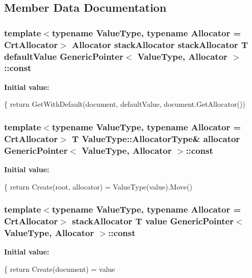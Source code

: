 \subsection{Member Data Documentation}
\subsubsection[{\texorpdfstring{const}{const}}]{\setlength{\rightskip}{0pt plus 5cm}template$<$typename Value\+Type, typename Allocator = Crt\+Allocator$>$ Allocator stack\+Allocator stack\+Allocator T default\+Value {\bf Generic\+Pointer}$<$ Value\+Type, Allocator $>$\+::const}\hypertarget{classGenericPointer_ad6e06cd83cf52e045c7e07a67078e973}{}\label{classGenericPointer_ad6e06cd83cf52e045c7e07a67078e973}
{\bfseries Initial value\+:}
\begin{DoxyCode}
\{
        \textcolor{keywordflow}{return} GetWithDefault(document, defaultValue, document.GetAllocator())
\end{DoxyCode}
\subsubsection[{\texorpdfstring{const}{const}}]{\setlength{\rightskip}{0pt plus 5cm}template$<$typename Value\+Type, typename Allocator = Crt\+Allocator$>$ T Value\+Type\+::\+Allocator\+Type\& allocator {\bf Generic\+Pointer}$<$ Value\+Type, Allocator $>$\+::const}\hypertarget{classGenericPointer_ace82428d4ad958b05a52480d949b32fa}{}\label{classGenericPointer_ace82428d4ad958b05a52480d949b32fa}
{\bfseries Initial value\+:}
\begin{DoxyCode}
\{
        \textcolor{keywordflow}{return} Create(root, allocator) = ValueType(value).Move()
\end{DoxyCode}
\subsubsection[{\texorpdfstring{const}{const}}]{\setlength{\rightskip}{0pt plus 5cm}template$<$typename Value\+Type, typename Allocator = Crt\+Allocator$>$ stack\+Allocator T value {\bf Generic\+Pointer}$<$ Value\+Type, Allocator $>$\+::const}\hypertarget{classGenericPointer_abb1b141cfe93b7159842b5cad60d1be3}{}\label{classGenericPointer_abb1b141cfe93b7159842b5cad60d1be3}
{\bfseries Initial value\+:}
\begin{DoxyCode}
\{
            \textcolor{keywordflow}{return} Create(document) = value
\end{DoxyCode}


